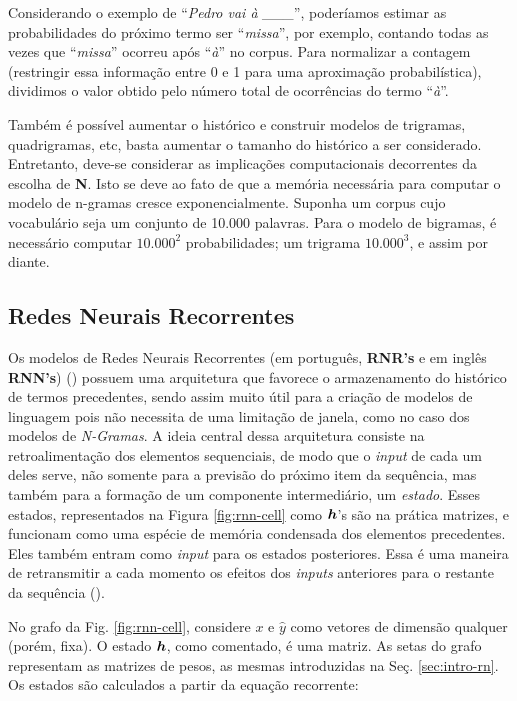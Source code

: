 Considerando o exemplo de “\textit{Pedro vai à \_\_\_}”, poderíamos estimar as probabilidades do próximo termo ser “\textit{missa}”, por exemplo, contando todas as vezes que “\textit{missa}” ocorreu após “\textit{à}” no corpus. Para normalizar a contagem (restringir essa informação entre 0 e 1 para uma aproximação probabilística), dividimos o valor obtido pelo número total de ocorrências do termo “\textit{à}”.

Também é possível aumentar o histórico e construir modelos de trigramas, quadrigramas, etc, basta aumentar o tamanho do histórico a ser considerado. Entretanto, deve-se considerar as implicações computacionais decorrentes da escolha de \textbf{N}. Isto se deve ao fato de que a memória necessária para computar o modelo de n-gramas cresce exponencialmente. Suponha um corpus cujo vocabulário seja um conjunto de 10.000 palavras. Para o modelo de bigramas, é necessário computar $10.000^{2}$ probabilidades; um trigrama $10.000^{3}$, e assim por diante.


\subsection{Redes Neurais Recorrentes}
\label{sec:RNN}

Os modelos de Redes Neurais Recorrentes (em português, \textbf{RNR's} e em inglês \textbf{RNN's}) (\cite{Goodfellow-et-al-2016}) possuem uma arquitetura que favorece o armazenamento do histórico de termos precedentes, sendo assim muito útil para a criação de modelos de linguagem pois não necessita de uma limitação de janela, como no caso dos modelos de \textit{N-Gramas}. A ideia central dessa arquitetura consiste na retroalimentação dos elementos sequenciais, de modo que o \textit{input} de cada um deles serve, não somente para a previsão do próximo item da sequência, mas também para a formação de um componente intermediário, um \textit{estado}. Esses estados, representados na Figura \ref{fig:rnn-cell} como $\bm{h}$'s são na prática matrizes, e funcionam como uma espécie de memória condensada dos elementos precedentes. Eles também entram como \textit{input }para os estados posteriores. Essa é uma maneira de retransmitir a cada momento os efeitos dos \textit{inputs} anteriores para o restante da sequência (\cite{Goodfellow-et-al-2016}). 



No grafo da Fig. \ref{fig:rnn-cell}, considere $x$ e $\hat{y}$ como vetores de dimensão qualquer (porém, fixa). O estado $\bm{h}$, como comentado, é uma matriz. As setas do grafo representam as matrizes de pesos, as mesmas introduzidas na Seç. \ref{sec:intro-rn}.
Os estados são calculados a partir da equação recorrente:

